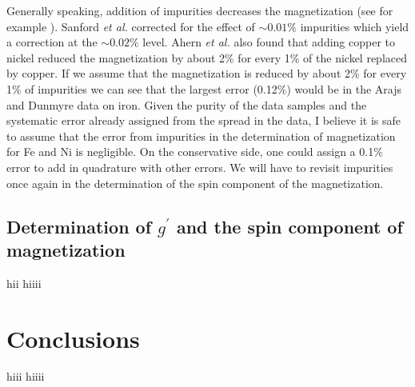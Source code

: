 \documentclass[12pt]{article}
\begin{document}
Generally speaking, addition of impurities decreases the magnetization (see for example \cite{Luborsky1980, Ahern1958, Sanford1941}). Sanford {\it et al.} corrected for the effect of $\sim0.01\%$ impurities which yield a correction at the $\sim0.02\%$ level\cite{Sanford1941}. Ahern {\it et al.} also found that adding copper to nickel reduced the magnetization by about 2\% for every 1\% of the nickel replaced by copper. If we assume that the magnetization is reduced by about 2\% for every 1\% of impurities we can see that the largest error (0.12\%) would be in the Arajs and Dunmyre data on iron. Given the purity of the data samples and the systematic error already assigned from the spread in the data, I believe it is safe to assume that the error from impurities in the determination of magnetization for Fe and Ni is negligible. On the conservative side, one could assign a 0.1\% error to add in quadrature with other errors. We will have to revisit impurities once again in the determination of the spin component of the magnetization.


\subsection{Determination of $g^{\prime}$ and the spin component of magnetization}
hii hiiii
\section{Conclusions}\label{conclusions}
hiii hiiii

%


\end{document}
